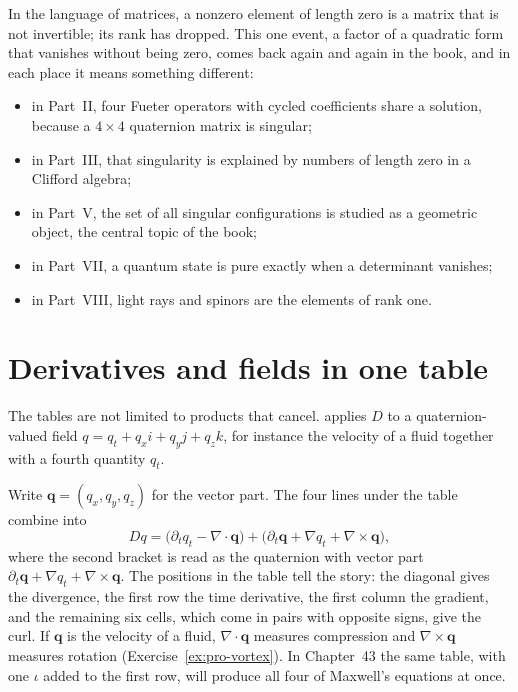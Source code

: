 In the language of matrices, a nonzero element of length zero is a matrix that is not invertible; its rank has dropped. This one event, a factor of a quadratic form that vanishes without being zero, comes back again and again in the book, and in each place it means something different:
\begin{itemize}[itemsep=0.2ex]
\item in Part~II, four Fueter operators with cycled coefficients share a solution, because a $4\times4$ quaternion matrix is singular;
\item in Part~III, that singularity is explained by numbers of length zero in a Clifford algebra;
\item in Part~V, the set of all singular configurations is studied as a geometric object, the central topic of the book;
\item in Part~VII, a quantum state is pure exactly when a determinant vanishes;
\item in Part~VIII, light rays and spinors are the elements of rank one.
\end{itemize}

\section{Derivatives and fields in one table}

The tables are not limited to products that cancel.  applies $D$ to a quaternion-valued field $q=q_t+q_x i+q_y j+q_z k$, for instance the velocity of a fluid together with a fourth quantity $q_t$.


Write $\mathbf q=(q_x,q_y,q_z)$ for the vector part. The four lines under the table combine into
\begin{equation}\label{eq:pro-dq}
  Dq=\bigl(\partial_t q_t-\nabla\!\cdot\mathbf q\bigr)+\bigl(\partial_t\mathbf q+\nabla q_t+\nabla\times\mathbf q\bigr),
\end{equation}
where the second bracket is read as the quaternion with vector part $\partial_t\mathbf q+\nabla q_t+\nabla\times\mathbf q$. The positions in the table tell the story: the diagonal gives the divergence, the first row the time derivative, the first column the gradient, and the remaining six cells, which come in pairs with opposite signs, give the curl. If $\mathbf q$ is the velocity of a fluid, $\nabla\cdot\mathbf q$ measures compression and $\nabla\times\mathbf q$ measures rotation (Exercise~\ref{ex:pro-vortex}). In Chapter~43 the same table, with one $\iota$ added to the first row, will produce all four of Maxwell's equations at once.

